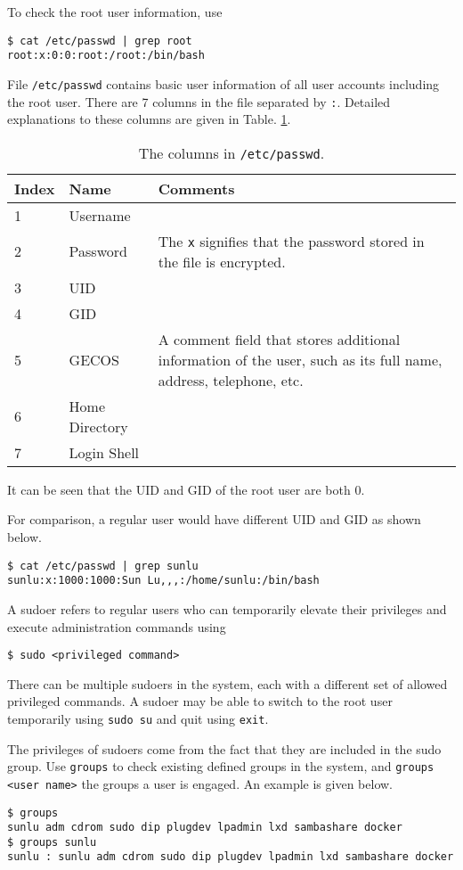 To check the root user information, use
\begin{lstlisting}
$ cat /etc/passwd | grep root
root:x:0:0:root:/root:/bin/bash
\end{lstlisting}
File \verb|/etc/passwd| contains basic user information of all user accounts including the root user. There are 7 columns in the file separated by \verb|:|. Detailed explanations to these columns are given in Table. \ref{tab:etcpasswd}.
\begin{table}[!htb]
  \centering \caption{The columns in \texttt{/etc/passwd}.}\label{tab:etcpasswd}
  \begin{tabularx}{\textwidth}{llX}
    \hline
    Index & Name & Comments \\ \hline
    1 & Username & \\ 
    2 & Password & The \verb|x| signifies that the password stored in the file is encrypted. \\ 
    3 & UID & \\
    4 & GID & \\
    5 & GECOS & A comment field that stores additional information of the user, such as its full name, address, telephone, etc. \\
    6 & Home Directory & \\
    7 & Login Shell & \\
    \hline
  \end{tabularx}
\end{table}
It can be seen that the UID and GID of the root user are both 0.

For comparison, a regular user would have different UID and GID as shown below.
\begin{lstlisting}
$ cat /etc/passwd | grep sunlu
sunlu:x:1000:1000:Sun Lu,,,:/home/sunlu:/bin/bash
\end{lstlisting}

A sudoer refers to regular users who can temporarily elevate their privileges and execute administration commands using 
\begin{lstlisting}
$ sudo <privileged command>
\end{lstlisting}
There can be multiple sudoers in the system, each with a different set of allowed privileged commands. A sudoer may be able to switch to the root user temporarily using \verb|sudo su| and quit using \verb|exit|.

The privileges of sudoers come from the fact that they are included in the sudo group. Use \verb|groups| to check existing defined groups in the system, and \verb|groups <user name>| the groups a user is engaged. An example is given below.
\begin{lstlisting}
$ groups
sunlu adm cdrom sudo dip plugdev lpadmin lxd sambashare docker
$ groups sunlu
sunlu : sunlu adm cdrom sudo dip plugdev lpadmin lxd sambashare docker
\end{lstlisting}

